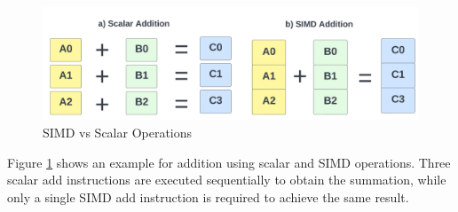 \begin{figure}[H]
\includegraphics[width=\textwidth]{imgs/simd-add.png}
\caption[SIMD vs Scalar]{SIMD vs Scalar Operations \cite{simdscalar}}\label{fig:simdscalar}
\end{figure}

Figure \ref{fig:simdscalar} shows an example for addition using scalar and SIMD operations. Three scalar add instructions are executed sequentially to obtain the summation, while only a single SIMD add instruction is required to achieve the same result.

